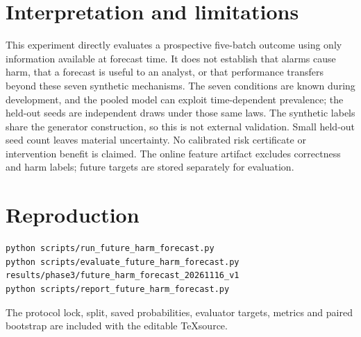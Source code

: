 \documentclass[10pt,a4paper]{article}
\begin{document}
\section{Interpretation and limitations}
This experiment directly evaluates a prospective five-batch outcome using only information available at forecast time. It does not establish that alarms cause harm, that a forecast is useful to an analyst, or that performance transfers beyond these seven synthetic mechanisms. The seven conditions are known during development, and the pooled model can exploit time-dependent prevalence; the held-out seeds are independent draws under those same laws. The synthetic labels share the generator construction, so this is not external validation. Small held-out seed count leaves material uncertainty. No calibrated risk certificate or intervention benefit is claimed. The online feature artifact excludes correctness and harm labels; future targets are stored separately for evaluation.
\section{Reproduction}
\begin{verbatim}
python scripts/run_future_harm_forecast.py
python scripts/evaluate_future_harm_forecast.py results/phase3/future_harm_forecast_20261116_v1
python scripts/report_future_harm_forecast.py
\end{verbatim}
The protocol lock, split, saved probabilities, evaluator targets, metrics and paired bootstrap are included with the editable \TeX source.
\end{document}
